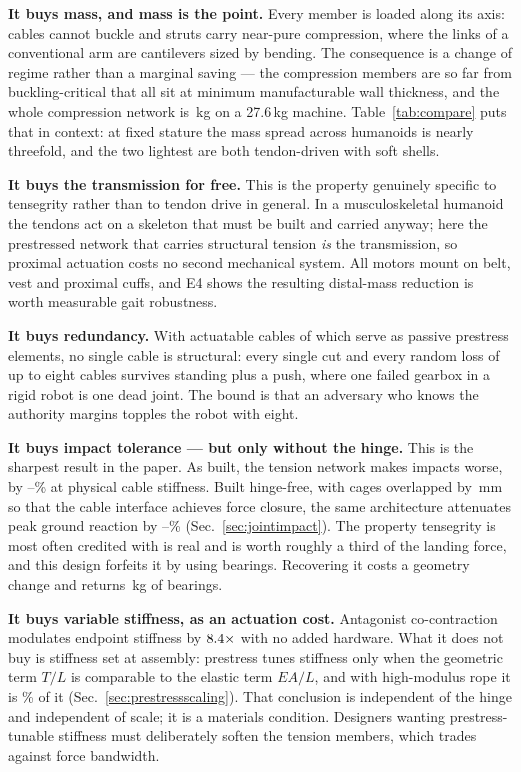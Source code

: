 \documentclass[conference]{IEEEtran}
\begin{document}
\textbf{It buys mass, and mass is the point.} Every member is loaded along its
axis: cables cannot buckle and struts carry near-pure compression, where the
links of a conventional arm are cantilevers sized by bending. The consequence
is a change of regime rather than a marginal saving --- the compression
members are so far from buckling-critical that all \numStruts{} sit at minimum
manufacturable wall thickness, and the whole compression network is
\strutSpecMass\,kg on a 27.6\,kg machine. Table~\ref{tab:compare} puts that in
context: at fixed stature the mass spread across humanoids is nearly
threefold, and the two lightest are both tendon-driven with soft shells.

\textbf{It buys the transmission for free.} This is the property genuinely
specific to tensegrity rather than to tendon drive in general. In a
musculoskeletal humanoid the tendons act on a skeleton that must be built and
carried anyway; here the prestressed network that carries structural tension
\emph{is} the transmission, so proximal actuation costs no second mechanical
system. All \numMotors{} motors mount on belt, vest and proximal cuffs, and E4
shows the resulting distal-mass reduction is worth measurable gait robustness.

\textbf{It buys redundancy.} With \numActuatable{} actuatable cables of which
\numPassiveCables{} serve as passive prestress elements, no single cable is
structural: every single cut and every random loss of up to eight cables
survives standing plus a push, where one failed gearbox in a rigid robot is one
dead joint. The bound is that an adversary who knows the authority margins
topples the robot with eight.

\textbf{It buys impact tolerance --- but only without the hinge.} This is the
sharpest result in the paper. As built, the tension network makes impacts
worse, by \physOneLimpTen--\physOneLimpHundred\% at physical cable stiffness.
Built hinge-free, with cages overlapped by \jointOverlapMm\,mm so that the
cable interface achieves force closure, the same architecture attenuates peak
ground reaction by \jointImpactLo--\jointImpactHi\%
(Sec.~\ref{sec:jointimpact}). The property tensegrity is most often credited
with is real and is worth roughly a third of the landing force, and this design
forfeits it by using bearings. Recovering it costs a geometry change and
returns \bearingMass\,kg of bearings.

\textbf{It buys variable stiffness, as an actuation cost.} Antagonist
co-contraction modulates endpoint stiffness by $8.4\times$ with no
added hardware. What it does not buy is stiffness set at assembly: prestress
tunes stiffness only when the geometric term $T/L$ is comparable to the elastic
term $EA/L$, and with high-modulus rope it is \jointGeomElasticRope\% of it
(Sec.~\ref{sec:prestressscaling}). That conclusion is independent of the hinge
and independent of scale; it is a materials condition. Designers wanting
prestress-tunable stiffness must deliberately soften the tension members, which
trades against force bandwidth.
\end{document}
